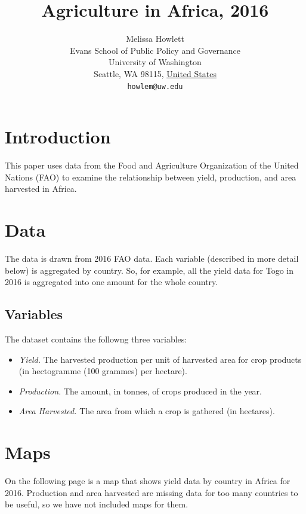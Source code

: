 \documentclass{article}
\title{Agriculture in Africa, 2016}
\author{
        Melissa Howlett\\
        Evans School of Public Policy and Governance\\
        University of Washington\\
        Seattle, WA 98115, \underline{United States}\\
        \texttt{howlem@uw.edu}
}
\begin{document}

\maketitle

\section{Introduction}\label{intro}
This paper uses data from the Food and Agriculture Organization of the United Nations (FAO) to examine the relationship between yield, production, and area harvested in Africa.

\section{Data}\label{datas}
The data is drawn from 2016 FAO data. Each variable (described in more detail below) is aggregated by country. So, for example, all the yield data for Togo in 2016 is aggregated into one amount for the whole country. 

\subsection{Variables}\label{eda}

The dataset contains the followng three variables:
\begin{itemize}
  \item \emph{Yield.} The harvested production per unit of harvested area for crop products (in hectogramme (100 grammes) per hectare). 
  \item \emph{Production.} The amount, in tonnes, of crops produced in the year. 
  \item \emph{Area Harvested.} The area from which a crop is gathered (in hectares). 
\end{itemize}


\section{Maps}\label{maps}
On the following page is a map that shows yield data by country in Africa for 2016. Production and area harvested are missing data for too many countries to be useful, so we have not included maps for them. 
\end{document}

